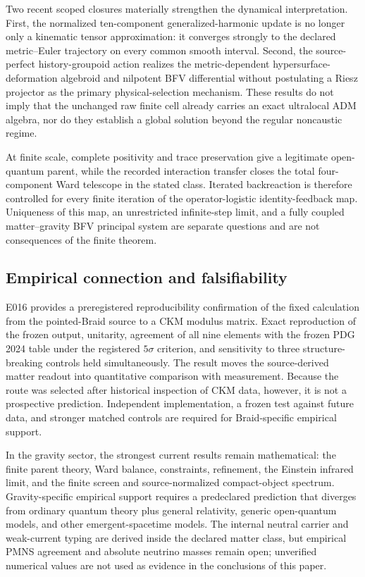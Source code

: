 \documentclass[11pt]{article}
\theoremstyle{definition}
\theoremstyle{remark}
\begin{document}
Two recent scoped closures materially strengthen the dynamical interpretation.
First, the normalized ten-component generalized-harmonic update is no longer
only a kinematic tensor approximation: it converges strongly to the declared
metric--Euler trajectory on every common smooth interval. Second, the
source-perfect history-groupoid action realizes the metric-dependent
hypersurface-deformation algebroid and nilpotent BFV differential without
postulating a Riesz projector as the primary physical-selection mechanism.
These results do not imply that the unchanged raw finite cell already carries
an exact ultralocal ADM algebra, nor do they establish a global solution beyond
the regular noncaustic regime.

At finite scale, complete positivity and trace preservation give a legitimate
open-quantum parent, while the recorded interaction transfer closes the total
four-component Ward telescope in the stated class. Iterated backreaction is
therefore controlled for every finite iteration of the operator-logistic
identity-feedback map. Uniqueness of this map, an unrestricted infinite-step
limit, and a fully coupled matter--gravity BFV principal system are separate
questions and are not consequences of the finite theorem.

\subsection{Empirical connection and falsifiability}

E016 provides a preregistered reproducibility confirmation of the fixed calculation from the pointed-Braid source to a CKM modulus matrix. Exact reproduction of the frozen output, unitarity, agreement of all nine elements with the frozen PDG 2024 table under the registered $5\sigma$ criterion, and sensitivity to three structure-breaking controls held simultaneously. The result moves the source-derived matter readout into quantitative comparison with measurement. Because the route was selected after historical inspection of CKM data, however, it is not a prospective prediction. Independent implementation, a frozen test against future data, and stronger matched controls are required for Braid-specific empirical support.

In the gravity sector, the strongest current results remain mathematical: the finite parent theory, Ward balance, constraints, refinement, the Einstein infrared limit, and the finite screen and source-normalized compact-object spectrum. Gravity-specific empirical support requires a predeclared prediction that diverges from ordinary quantum theory plus general relativity, generic open-quantum models, and other emergent-spacetime models. The internal neutral carrier and weak-current typing are derived inside the declared matter class, but empirical PMNS agreement and absolute neutrino masses remain open; unverified numerical values are not used as evidence in the conclusions of this paper.
\end{document}
